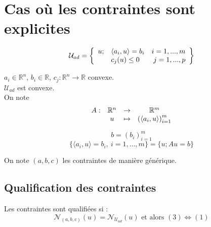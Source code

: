 \section{Cas où les contraintes sont explicites}
\[\mathcal{U}_{ad}=\left\{\begin{array}{c l r}
	u; & \langle a_i, u\rangle = b_i & i=1,...,m\\
	   & c_j(u)\leq 0 		 & j=1,...,p
\end{array}\right\} \]

$a_i\in\mathbb{R}^n$, $b_i\in\mathbb{R}$, $c_j:\mathbb{R}^n\to\mathbb{R}$ convexe.\\
$\mathcal{U}_{ad}$ est convexe.\\
On note \[\begin{array}{l c c c}
A : & \mathbb{R}^n &\to& \mathbb{R}^m\\
    &       u    &\mapsto&     \left( \langle a_i,u\rangle \right)_{i=1}^m
\end{array} \]

\[b=\left( b_i \right)_{i=1}^m \]
\[\{\langle a_i,u\rangle=b_i,\ i=1,...,m\} = \{u; Au=b\}\]

On note $(a,b,c)$ les contraintes de manière générique.



\subsection{Qualification des contraintes}
Les contraintes sont qualifiées si :
	\[\mathscr{N}_{(a,b,c)}(u)=\mathscr{N}_{\mathcal{U}_{ad}}(u) \text{ et alors } (3)\Leftrightarrow(1)\]


